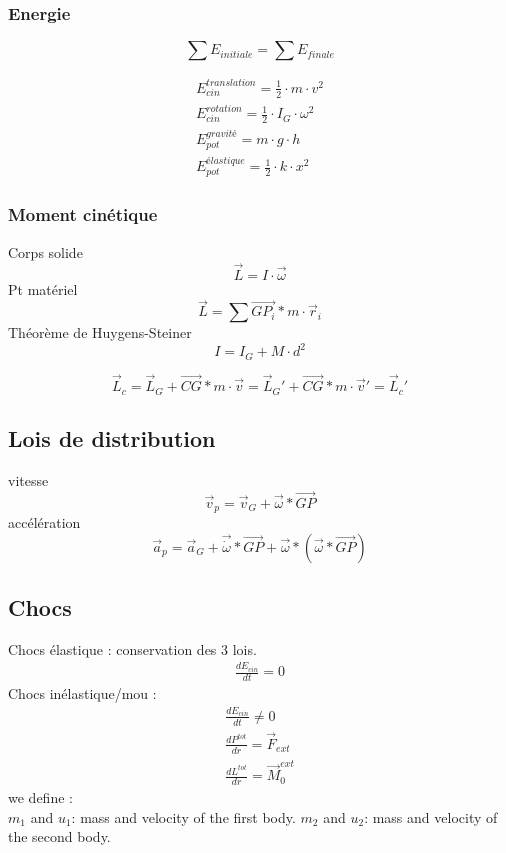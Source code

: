 \subsubsection{Energie}
\begin{equation}
\sum E_{initiale}=\sum E_{finale}
\end{equation}

\begin{eqnarray}
E_{cin}^{translation}=\frac{1}{2} \cdot m \cdot v^2\\
E_{cin}^{rotation}=\frac{1}{2} \cdot I_G \cdot \omega^2\\
E_{pot}^{gravité}=m \cdot g \cdot h\\
E_{pot}^{élastique}=\frac{1}{2} \cdot k \cdot x^2
\end{eqnarray}

\subsubsection{Moment cinétique}
Corps solide
\begin{equation}
\vec{L}=I \cdot \vec{\omega}
\end{equation}
Pt matériel
\begin{equation}
\vec{L}=\sum \vec{GP_i}*m\cdot \vec{r}_i
\end{equation}
Théorème de Huygens-Steiner
\begin{equation}
I=I_G+M \cdot d^2
\end{equation}

\begin{equation}
\vec{L}_c=\vec{L}_G+ \vec{CG} * m \cdot \vec{v}=\vec{L}_G'+ \vec{CG} * m \cdot \vec{v}'=\vec{L}_c'
\end{equation}

\subsection{Lois de distribution}
vitesse
\begin{equation}
\vec{v}_p=\vec{v}_G+\vec{\omega}*\vec{GP}
\end{equation}
accélération
\begin{equation}
\vec{a}_p=\vec{a}_G+\vec{\dot{\omega}}*\vec{GP}+\vec{\omega}*(\vec{\omega}*\vec{GP})
\end{equation}

\subsection{Chocs}
Chocs élastique : conservation des 3 lois. 
\begin{eqnarray}
\frac{dE_{cin}}{dt} =0
\end{eqnarray}
Chocs inélastique/mou :
\begin{eqnarray}
\frac{dE_{cin}}{dt} \neq 0\\
\frac{d P^{tot}}{dr}=\vec{F}_{ext}\\
\frac{d L^{tot}}{dr}=\vec{M}_{0}^{ext}
\end{eqnarray}
we define : \\
$m_1$ and $u_1$: mass and velocity of the first body. $m_2$ and $u_2$: mass and velocity of the second body.

